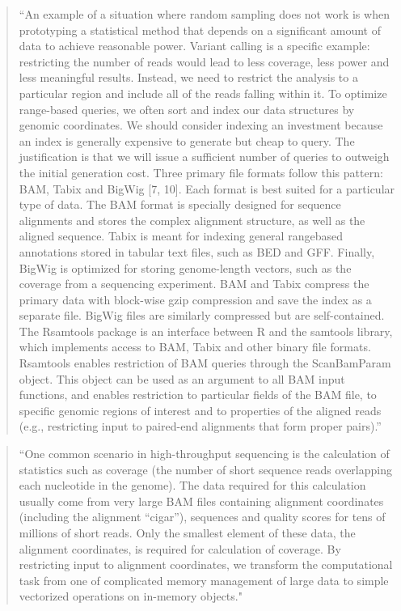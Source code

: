 \documentclass[]{tufte-book}
\begin{document}
\begin{quote}
``An example of a situation where random sampling does not work is when
prototyping a statistical method that depends on a significant amount of data to
achieve reasonable power. Variant calling is a specific example: restricting the
number of reads would lead to less coverage, less power and less meaningful
results. Instead, we need to restrict the analysis to a particular region and
include all of the reads falling within it. To optimize range-based queries, we
often sort and index our data structures by genomic coordinates. We should
consider indexing an investment because an index is generally expensive to
generate but cheap to query. The justification is that we will issue a
sufficient number of queries to outweigh the initial generation cost. Three
primary file formats follow this pattern: BAM, Tabix and BigWig {[}7, 10{]}. Each
format is best suited for a particular type of data. The BAM format is specially
designed for sequence alignments and stores the complex alignment structure, as
well as the aligned sequence. Tabix is meant for indexing general rangebased
annotations stored in tabular text files, such as BED and GFF. Finally, BigWig
is optimized for storing genome-length vectors, such as the coverage from a
sequencing experiment. BAM and Tabix compress the primary data with block-wise
gzip compression and save the index as a separate file. BigWig files are
similarly compressed but are self-contained. The Rsamtools package is an
interface between R and the samtools library, which implements access to BAM,
Tabix and other binary file formats. Rsamtools enables restriction of BAM
queries through the ScanBamParam object. This object can be used as an argument
to all BAM input functions, and enables restriction to particular fields of the
BAM file, to specific genomic regions of interest and to properties of the
aligned reads (e.g., restricting input to paired-end alignments that form proper
pairs).'' \citep{lawrence2014scalable}
\end{quote}

\begin{quote}
``One common scenario in high-throughput sequencing is the calculation of
statistics such as coverage (the number of short sequence reads overlapping each
nucleotide in the genome). The data required for this calculation usually come
from very large BAM files containing alignment coordinates (including the
alignment ``cigar''), sequences and quality scores for tens of millions of short
reads. Only the smallest element of these data, the alignment coordinates, is
required for calculation of coverage. By restricting input to alignment
coordinates, we transform the computational task from one of complicated memory
management of large data to simple vectorized operations on in-memory objects."
\citep{lawrence2014scalable}
\end{quote}
\end{document}
